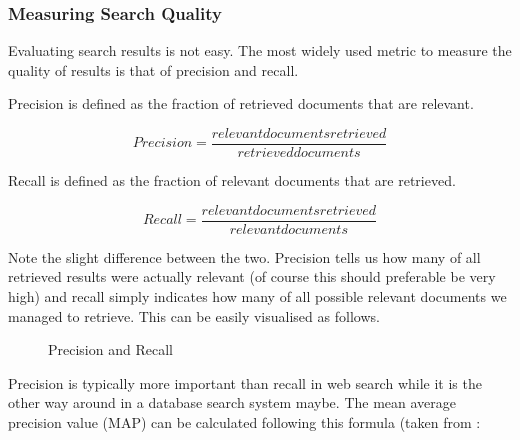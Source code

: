 \subsubsection{Measuring Search Quality}

Evaluating search results is not easy. The most widely used metric to measure the quality of results is that of precision and recall.

Precision is defined as the fraction of retrieved documents that are relevant.

\begin{equation}
  Precision = \frac{relevant documents retrieved}{retrieved documents}
  \label{eq:precision}
\end{equation}

Recall is defined as the fraction of relevant documents that are retrieved.

\begin{equation}
  Recall = \frac{relevant documents retrieved}{relevant documents}
  \label{eq:recall}
\end{equation}

Note the slight difference between the two. Precision tells us how many of all retrieved results were actually relevant (of course this should preferable be very high) and recall simply indicates how many of all possible relevant documents we managed to retrieve. This can be easily visualised as follows.

\def\leftcircle{(0,0) circle (1.5cm)}
\def\rightcircle{(0:2cm) circle (1.5cm)}

\begin{figure}[htb]
  \centering
\caption[Precision and Recall]{Precision and Recall}
\label{fig:PR}
\end{figure}

Precision is typically more important than recall in web search while it is the other way around in a database search system maybe. The mean average precision value (MAP) can be calculated following this formula (taken from \citep[p.141]{Baeza-Yates2011}:

